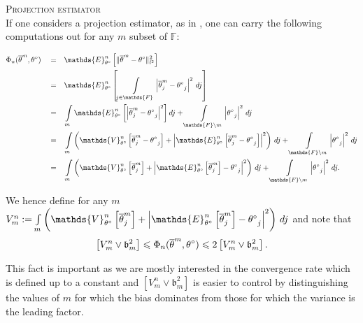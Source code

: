 \begin{Liste}[]
\begin{ex}{\textsc{Projection estimator} \\}\label{EX_INTRO_FREQ_DECISION_RISKFUNCTION_MSEPROJ}
If one considers a projection estimator, as in , one can carry the following computations out for any $m$ subset of $\mathds{F}$:

\begin{alignat*}{3}
& \Phi_{n}(\overline{\theta}^{m}, \fxdf) && = && \mathds{E}_{\theta^{\circ}}^{n}\left[\Vert \overline{\theta}^{m} - \fxdf \Vert_{l^{2}}^{2} \right]\\
& && = && \mathds{E}_{\theta^{\circ}}^{n}\left[\int\limits_{j \in \mathds{F}} \left\vert \overline{\theta}^{m}_{j} - \fxdf_{j} \right\vert^{2} \, dj \right]\\
& &&=&&\int\limits_{m} \mathds{E}_{\theta^{\circ}}^{n}\left[ \left\vert \overline{\theta}^{m}_{j} - \fxdf_{j} \right\vert^{2} \right] dj + \int\limits_{\mathds{F} \setminus m} \left\vert \fxdf_{j} \right\vert^{2} \, dj\\
& &&=&&\int\limits_{m} \left(\mathds{V}_{\theta^{\circ}}^{n}\left[ \overline{\theta}^{m}_{j} - \fxdf_{j} \right] + \left\vert \mathds{E}_{\theta^{\circ}}^{n}\left[\overline{\theta}^{m}_{j} - \fxdf_{j}\right]\right\vert^{2} \right) \, dj + \int\limits_{\mathds{F} \setminus m} \left\vert \fxdf_{j} \right\vert^{2} \, dj\\
& &&=&&\int\limits_{m} \left(\mathds{V}_{\theta^{\circ}}^{n}\left[ \overline{\theta}^{m}_{j}\right] + \left\vert \mathds{E}_{\theta^{\circ}}^{n}\left[\overline{\theta}^{m}_{j}\right] - \fxdf_{j} \right\vert^{2} \right) \, dj + \int\limits_{\mathds{F} \setminus m} \left\vert \fxdf_{j} \right\vert^{2} \, dj.
\end{alignat*}

We hence define for any $m$ $V_{m}^{n} := \int\limits_{m} \left(\mathds{V}_{\theta^{\circ}}^{n}\left[ \overline{\theta}^{m}_{j}\right] + \left\vert \mathds{E}_{\theta^{\circ}}^{n}\left[\overline{\theta}^{m}_{j}\right] - \fxdf_{j} \right\vert^{2} \right) \, dj$ and note that
\[\left[V_{m}^{n} \vee \mathfrak{b}_{m}^{2}\right] \leqslant \Phi_{n}(\overline{\theta}^{m}, {\theta^{\circ}_{}}) \leqslant 2 \left[V_{m}^{n} \vee \mathfrak{b}_{m}^{2}\right].\]

This fact is important as we are mostly interested in the convergence rate which is defined up to a constant and $\left[V_{m}^{n} \vee \mathfrak{b}_{m}^{2}\right]$ is easier to control by distinguishing the values of $m$ for which the bias dominates from those for which the variance is the leading factor.
\end{ex}


\end{Liste}
